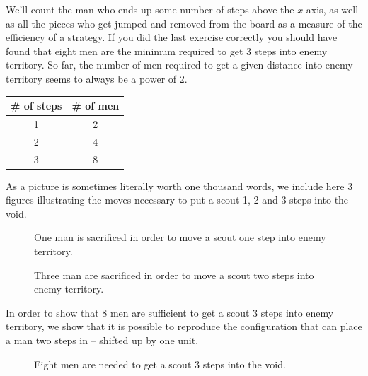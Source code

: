 We'll count the man who ends up some number of steps above the
$x$-axis, as well as all the pieces who get jumped and removed
from the board as a measure of the efficiency of a strategy.
If you did the last exercise correctly you should have found that 
eight men are the minimum required to get 3 steps into enemy 
territory.  So far, the number of men required to get a given
distance into enemy territory seems to always be a power of 
2.

\begin{center}
\begin{tabular}{c|c}
\# of steps & \# of men \\ \hline
1 & 2 \\
2 & 4 \\
3 & 8 \\
\end{tabular}
\end{center}  

As a picture is sometimes literally worth one thousand words, we
include here 3 figures illustrating the moves necessary to put 
a scout 1, 2 and 3 steps into the void.

\begin{figure}[!hbtp] 
\begin{center}

\end{center}
\caption[Moving one step into the void is trivial.]{One man is sacrificed in 
order to move a scout one step into enemy territory.}
\label{fig:one_step}
\end{figure}

\begin{figure}[!hbtp] 
\begin{center}

\end{center}
\caption[Moving two steps into the void is more difficult.]{Three man are sacrificed in 
order to move a scout two steps into enemy territory.}
\label{fig:two_steps}
\end{figure}

In order to show that 8 men are sufficient to get a scout 3 steps into
enemy territory, we show that it is possible to reproduce the configuration
that can place a man two steps in -- shifted up by one unit.

\begin{figure}[!hbtp] 
\begin{center}

\end{center}
\caption[Moving three steps into the void takes 8 men.]{Eight men are needed to
get a scout 3 steps into the void.}
\label{fig:three_steps}
\end{figure}


